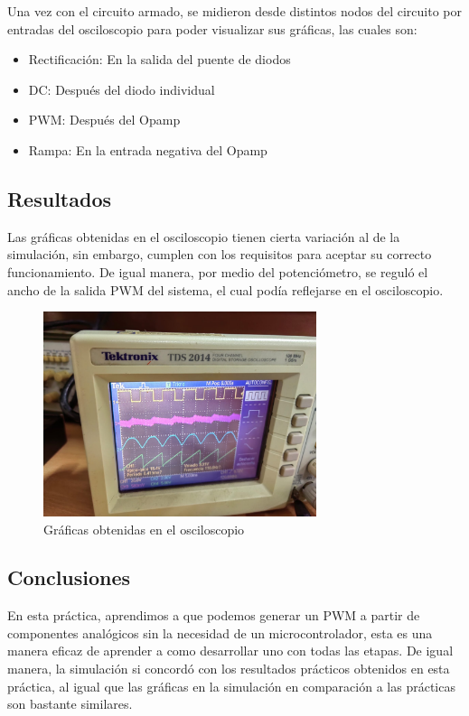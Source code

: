 Una vez con el circuito armado, se midieron desde distintos nodos del circuito por entradas del osciloscopio para poder visualizar sus gráficas, las cuales son:

\begin{itemize}
    \item Rectificación: En la salida del puente de diodos
    \item DC: Después del diodo individual
    \item PWM: Después del Opamp
    \item Rampa: En la entrada negativa del Opamp
\end{itemize}

\subsection{Resultados}

Las gráficas obtenidas en el osciloscopio tienen cierta variación al de la simulación, sin embargo, cumplen con los requisitos para aceptar su correcto funcionamiento.
De igual manera, por medio del potenciómetro, se reguló el ancho de la salida PWM del sistema, el cual podía reflejarse en el osciloscopio.

\begin{figure}
    \centering
    \includegraphics[width=8cm]{media/Resultados.jpg}
    \caption{Gráficas obtenidas en el osciloscopio}
\end{figure}

\subsection{Conclusiones}

En esta práctica, aprendimos a que podemos generar un PWM a partir de componentes analógicos sin la necesidad de un microcontrolador, esta es una manera eficaz de
aprender a como desarrollar uno con todas las etapas. De igual manera, la simulación si concordó con los resultados prácticos obtenidos en esta práctica, al igual que las gráficas
en la simulación en comparación a las prácticas son bastante similares.
